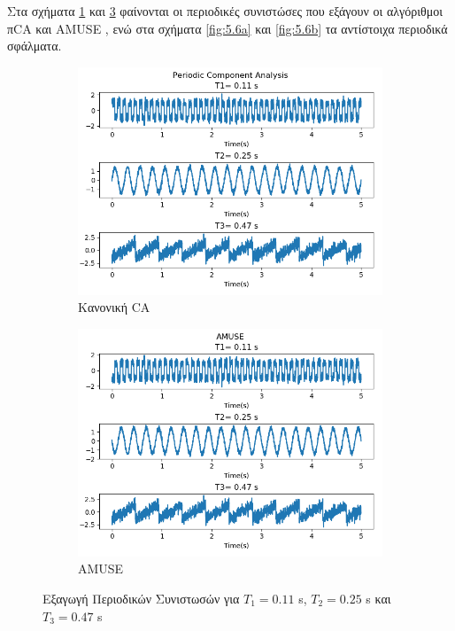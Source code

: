 \noindent Στα σχήματα \en \ref{fig:5.5a} \gr και \en \ref{fig:5.5b} \gr φαίνονται οι περιοδικές συνιστώσες που εξάγουν οι αλγόριθμοι π\en CA \gr και \en AMUSE \gr, ενώ στα σχήματα \en \ref{fig:5.6a} \gr και \en \ref{fig:5.6b} \gr τα αντίστοιχα περιοδικά σφάλματα.
\begin{figure}[H]
    \centering
    \begin{subfigure}{0.48 \textwidth}
        \centering
       \includegraphics[width=\textwidth]{fwto/piCA_1.png}\en
        \caption{\gr Κανονική \en \pi CA} \gr
        \label{fig:5.5a}
    \end{subfigure}
    \hfill
    \begin{subfigure}{0.48 \textwidth}
        \centering
       \includegraphics[width=\textwidth]{fwto/Amuse_1.png}
        \en
        \caption{AMUSE} \gr
        \label{fig:5.5b}
    \end{subfigure}
    \gr
    \caption{Εξαγωγή Περιοδικών Συνιστωσών για \en $T_1 = 0.11$ s, $T_2 = 0.25$ s \gr και \en $T_3 = 0.47$ s \gr}
\end{figure}
